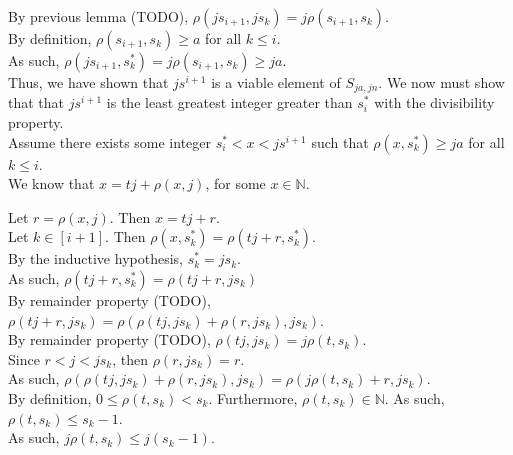 \documentclass[a4paper,12pt]{article}
\begin{document}
\noindent By previous lemma (TODO), $\rho(js_{i+1}, js_k) = j \rho(s_{i+1}, s_k)$.\\

\noindent By definition, $\rho(s_{i+1}, s_k) \geq a$ for all $k \leq i$.\\

\noindent As such, $\rho(js_{i+1}, s^*_k) = j \rho(s_{i+1}, s_k) \geq ja$.\\

\noindent Thus, we have shown that $js^{i+1}$ is a viable element of $S_{ja, jn}$. We now must show that that $js^{i+1}$ is the least greatest integer greater than $s^*_i$ with the divisibility property.\\

\noindent Assume there exists some integer $s^*_i < x < js^{i+1}$ such that $\rho(x, s^*_k) \geq ja$ for all $k \leq i$.\\

\noindent We know that $x = tj + \rho(x, j)$, for some $x \in \mathbb{N}$.

\noindent Let $r = \rho(x, j)$. Then $x = tj + r$.\\

\noindent Let $k \in [i + 1]$. Then $\rho(x, s^*_k) = \rho(tj + r, s^*_k)$.\\

\noindent By the inductive hypothesis, $s^*_k = js_k$.\\

\noindent As such, $\rho(tj + r, s^*_k) = \rho(tj + r, js_k)$\\

\noindent By remainder property (TODO), $\rho(tj + r, js_k) = \rho(\rho(tj, js_k) + \rho(r, js_k), js_k)$.\\

\noindent By remainder property (TODO), $\rho(tj, js_k) = j \rho(t, s_k)$.\\

\noindent Since $r < j < js_k$, then $\rho(r, js_k) = r$.\\

\noindent As such, $\rho(\rho(tj, js_k) + \rho(r, js_k), js_k) = \rho(j \rho(t, s_k) + r, js_k)$.\\

\noindent By definition, $0 \leq \rho(t, s_k) < s_k$. Furthermore, $\rho(t, s_k) \in \mathbb{N}$. As such, $\rho(t, s_k) \leq s_k - 1$.\\

\noindent As such, $j \rho(t, s_k) \leq j(s_k - 1)$.\\
\end{document}

